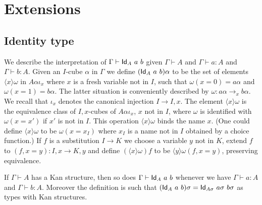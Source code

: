 \documentclass[10pt,a4paper]{article}
\makeatletter
\newcommand{\Id}{{\sf Id}}
\newcommand{\bind}[2]{{\langle}#1{\rangle}#2}
\newcommand{\napp}{\mathop{\boldsymbol{@}}}
\makeatother
\begin{document}
\section{Extensions}

\subsection{Identity type}
\label{sec:identity-type}

We describe the interpretation of $\Gamma\vdash\Id_A~a~b$ given
$\Gamma\vdash A$ and $\Gamma\vdash a:A$ and $\Gamma\vdash b:A$. Given
an $I$-cube $\alpha$ in $\Gamma$ we define $(\Id_A~a~b)\alpha$ to be
the set of elements $\bind{x}{\omega}$ in $A\alpha\iota_x$ where $x$ is a
fresh variable not in $I$, such that $\omega(x=0) = a\alpha$ and
$\omega(x=1) = b\alpha$. The latter situation is conveniently
described by $\omega: a\alpha\to_x b\alpha$.  We recall that $\iota_x$
denotes the canonical injection $I \to I,x$. The element
$\bind{x}{\omega}$ is the equivalence class of $I,x$-cubes of
$A\alpha \iota_x$, $x$ not in $I$, where $\omega$ is identified with
$\omega(x=x')$ if $x'$ is not in $I$. This operation
$\bind{x}{\omega}$ binds the name $x$.  (One could define
$\bind{x}{\omega}$ to be $\omega(x = x_I)$ where $x_I$ is a name not
in $I$ obtained by a choice function.) If $f$ is a substitution $I \to
K$ we choose a variable $y$ not in $K$, extend $f$ to $(f,x=y): I,x
\to K,y$ and define $(\bind{x}{\omega}) f$ to be $\bind{y}{\omega
  (f,x=y)}$, preserving equivalence.

\begin{theorem}
  If $\Gamma\vdash A$ has a Kan structure, then so does
  $\Gamma\vdash\Id_A~a~b$ whenever we have $\Gamma\vdash a:A$ and
  $\Gamma\vdash b:A$.  Moreover the definition is such that
  $(\Id_A~a~b) \sigma = \Id_{A \sigma}~a \sigma~b \sigma$ as types
  with Kan structures.
\end{theorem}
\end{document}

